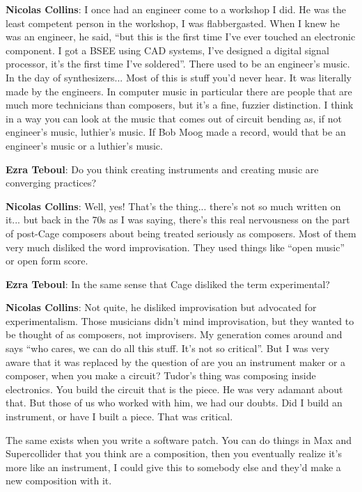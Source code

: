 \textbf{Nicolas Collins}: I once had an engineer come to a workshop I did. He was the least competent person in the workshop, I was flabbergasted. When I knew he was an engineer, he said, ``but this is the first time I’ve ever touched an electronic component. I got a BSEE using CAD systems, I’ve designed a digital signal processor, it’s the first time I’ve soldered''. There used to be an engineer’s music. In the day of synthesizers... Most of this is stuff you’d never hear. It was literally made by the engineers. In computer music in particular there are people that are much more technicians than composers, but it’s a fine, fuzzier distinction. I think in a way you can look at the music that comes out of circuit bending as, if not engineer’s music, luthier’s music. If Bob Moog made a record, would that be an engineer’s music or a luthier’s music.
					
\textbf{Ezra Teboul}: Do you think creating instruments and creating music are converging practices?
					
\textbf{Nicolas Collins}: Well, yes! That’s the thing... there’s not so much written on it... but back in the 70s as I was saying, there’s this real nervousness on the part of post-Cage composers about being treated seriously as composers. Most of them very much disliked the word improvisation. They used things like ``open music'' or open form score.
					
\textbf{Ezra Teboul}: In the same sense that Cage disliked the term experimental?
					
\textbf{Nicolas Collins}: Not quite, he disliked improvisation but advocated for experimentalism. Those musicians didn’t mind improvisation, but they wanted to be thought of as composers, not improvisers. My generation comes around and says ``who cares, we can do all this stuff. It’s not so critical''. But I was very aware that it was replaced by the question of are you an instrument maker or a composer, when you make a circuit? Tudor’s thing was composing inside electronics. You build the circuit that is the piece. He was very adamant about that. But those of us who worked with him, we had our doubts. Did I build an instrument, or have I built a piece. That was critical.		
						
The same exists when you write a software patch. You can do things in Max and Supercollider that you think are a composition, then you eventually realize it’s more like an instrument, I could give this to somebody else and they’d make a new composition with it.
					
